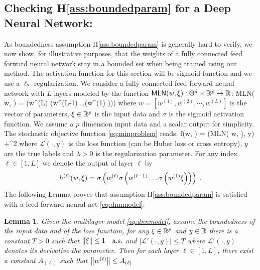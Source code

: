 \documentclass[11pt]{article}
\newtheorem{Lemma}{Lemma}
\theoremstyle{k}
\begin{document}
\subsection{Checking H\ref{ass:boundedparam} for a Deep Neural Network:}
As boundedness assumption H\ref{ass:boundedparam} is generally hard to verify, we now show, for illustrative purposes, that the weights of a fully connected feed forward neural network stay in a bounded set when being trained using our method. 
The activation function for this section will be sigmoid function and we use a $\ell_2$ regularization. 
We consider a fully connected feed forward neural network with $L$ layers modeled by the function $\textsf{MLN}(w, \xi): \Theta^d \times \mathbb{R}^p \to \mathbb{R}$:
\beq\label{eq:dnnmodel}
\textsf{MLN}( w, \xi) = \sigma\left(w^{(L)} \sigma\left(w^{(L-1)} \ldots \sigma\left(w^{(1)} \xi \right)\right)\right)
\eeq
where $w = [w^{(1)}, w^{(2)}, \cdots , w^{(L)}]$ is the vector of parameters, $\xi \in \mathbb{R}^p$ is the input data and $\sigma$ is the sigmoid activation function. We assume a $p$ dimension input data and a scalar output for simplicity.
The stochastic objective function \eqref{eq:minproblem} reads:
\beq \notag
f(w, \xi) = (\textsf{MLN}( w, \xi), y) +^2
\eeq
where $\mathcal{L}(\cdot, y)$ is the loss function (can be Huber loss or cross entropy), $y$ are the true labels and $\lambda >0$ is the regularization parameter.
For any index $\ell \in [1, L]$ we denote the output of layer $\ell$ by 
$$
h^{(\ell)}(w,\xi)= \sigma\left(w^{(\ell)} \sigma\left(w^{(\ell-1)} \ldots \sigma\left(w^{(1)} \xi \right)\right)\right) \;.
$$
The following Lemma proves that assumption H\ref{ass:boundedparam} is satisfied with a feed forward neural net \eqref{eq:dnnmodel}:
\begin{Lemma}\label{lem:dnnh2} 
Given the multilayer model \eqref{eq:dnnmodel}, assume the boundedness of the input data and of the loss function, \ie for any $\xi \in \mathbb{R}^p$ and $y \in \mathbb{R}$ there is a constant $T >0$ such that $\left\Vert \xi \right\Vert \leq 1 \quad \textrm{a.s.}$ and $|\mathcal{L}'(\cdot, y)| \leq T$ where $\mathcal{L}'(\cdot, y)$ denotes its derivative \wrt the parameter. Then for each layer $\ell \in [1,L]$, there exist a constant $A_{(\ell)}$ such that $\left\Vert w^{(\ell)} \right\Vert \leq A_{(\ell)}$
\end{Lemma}
\end{document}
